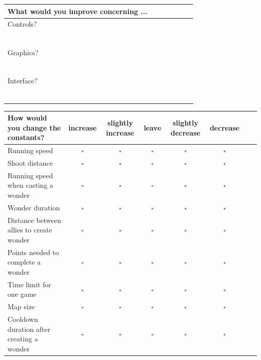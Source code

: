 \documentclass[11pt,a4paper,titlepage,table]{article}
\begin{document}
\begin{table}[H]
\begin{tabularx}{1.1\textwidth}{|X|X|S|S|S|S|X|}
	\hline What would you improve concerning ... \\
  	\hline Controls? \\\\\\\\\\\\\\
  	\hline Graphics?  \\\\\\\\\\\\\\
  	\hline Interface?  \\\\\\\\\\\\\\
  	\hline
\end{tabularx}
\end{table}

\begin{table}[H]
\begin{tabularx}{1.1\textwidth}{|X|S|S|S|S|S|S|X|}
	\hline
  		How would you change the constants? & increase & slightly increase & leave & slightly decrease & decrease \\
  	\hline
  		Running speed & 
  			$\square$ & $\square$ & $\square$ & $\square$ & $\square$ \\
  	\hline
  		Shoot distance & 
  			$\square$ & $\square$ & $\square$ & $\square$ & $\square$ \\
  	\hline
		Running speed when casting a wonder & 
			$\square$ & $\square$ & $\square$ & $\square$ & $\square$ \\
	\hline
  		Wonder duration & 
  			$\square$ & $\square$ & $\square$ & $\square$ & $\square$ \\
  	\hline
  		Distance between allies to create wonder& 
  			$\square$ & $\square$ & $\square$ & $\square$ & $\square$ \\
  	\hline
  		Points needed to complete a wonder & 
  			$\square$ & $\square$ & $\square$ & $\square$ & $\square$ \\
  	 \hline
  		Time limit for one game & 
  			$\square$ & $\square$ & $\square$ & $\square$ & $\square$ \\
  	\hline
  		Map size & 
  			$\square$ & $\square$ & $\square$ & $\square$ & $\square$ \\
  	\hline
  		Cooldown duration after creating a wonder & 
  			$\square$ & $\square$ & $\square$ & $\square$ & $\square$ \\
	\hline
\end{tabularx}
\end{table}
\end{document}
